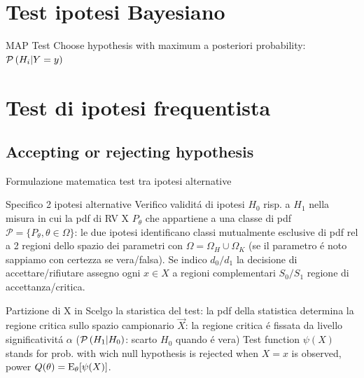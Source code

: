 \documentclass[asd-beamer.tex]{subfiles}
\begin{document}
	
\section{Test ipotesi Bayesiano}

\begin{frame}{MAP Test}
Choose hypothesis with maximum a posteriori probability: $\operatorname{\mathcal{P}}{(H_i|Y=y)}$
\end{frame}

\section{Test di ipotesi frequentista}


\subsection{Accepting or rejecting hypothesis}
	
\begin{frame}{Formulazione matematica test tra ipotesi alternative}\frameintoc
\begin{block}{Specifico 2 ipotesi alternative}
Verifico validit\'a di ipotesi $H_0$ risp. a $H_1$ nella misura in cui la pdf di RV X $P_{\theta}$ che appartiene a una classe di pdf $\mathcal{P}=\{P_{\theta}, \theta\in\Omega\}$: le due ipotesi identificano classi mutualmente esclusive di pdf rel a 2 regioni dello spazio dei parametri con $\Omega=\Omega_H\cup\Omega_K$ (se il parametro \'e noto sappiamo con certezza se vera/falsa). Se indico $d_0/d_1$ la decisione di accettare/rifiutare assegno ogni $x\in X$ a regioni complementari $S_0/S_1$ regione di accettanza/critica.
\end{block}
\begin{block}{Partizione di X in }
Scelgo la staristica del test: la pdf della statistica determina la regione critica sullo spazio campionario $\vec{X}$: la regione critica \'e fissata da livello significativit\'a $\alpha$ ($\operatorname{\mathcal{P}}{(H_1|H_0)}$: scarto $H_0$ quando \'e vera)
Test function $\psi(X)$ stands for prob. with wich null hypothesis is rejected when $X=x$ is observed, power $Q(\theta)=\operatorname{E}_{\theta}[\psi(X)]$.
\end{block}
\end{frame}
\end{document}
